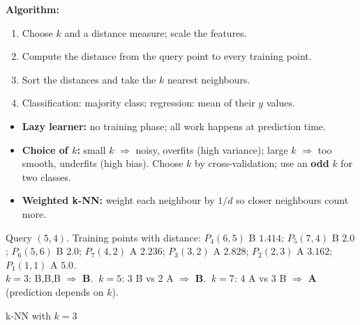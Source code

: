 \textbf{Algorithm:}
\begin{enumerate}
  \item Choose $k$ and a distance measure; scale the features.
  \item Compute the distance from the query point to every training point.
  \item Sort the distances and take the $k$ nearest neighbours.
  \item Classification: majority class; regression: mean of their $y$ values.
\end{enumerate}

\begin{itemize}
  \item \textbf{Lazy learner:} no training phase; all work happens at prediction time.
  \item \textbf{Choice of $k$:} small $k$ $\Rightarrow$ noisy, overfits (high variance); large $k$ $\Rightarrow$ too smooth, underfits (high bias). Choose $k$ by cross-validation; use an \textbf{odd} $k$ for two classes.
  \item \textbf{Weighted k-NN:} weight each neighbour by $1/d$ so closer neighbours count more.
\end{itemize}

\begin{numer}[: k-NN classification]
Query $(5,4)$. Training points with distance: $P_4(6,5)$ B $1.414$; $P_5(7,4)$ B $2.0$; $P_6(5,6)$ B $2.0$; $P_7(4,2)$ A $2.236$; $P_3(3,2)$ A $2.828$; $P_2(2,3)$ A $3.162$; $P_1(1,1)$ A $5.0$.\\
$k=3$: B,B,B $\Rightarrow$ \textbf{B}. $\ k=5$: 3 B vs 2 A $\Rightarrow$ \textbf{B}. $\ k=7$: 4 A vs 3 B $\Rightarrow$ \textbf{A} (prediction depends on $k$).
\end{numer}

\begin{drawit}{k-NN with $k=3$}
\centering
{}
\end{drawit}

